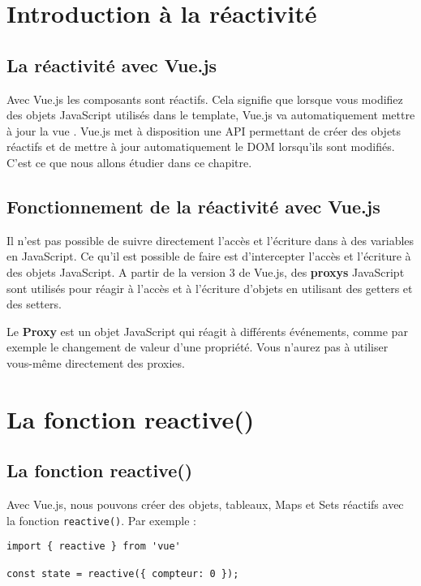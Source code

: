 \section{Introduction à la réactivité}
\subsection{La réactivité avec {\color{monOrange}Vue.js}}
Avec {\color{monOrange}Vue.js} les composants sont réactifs. Cela signifie que lorsque vous modifiez des objets JavaScript utilisés dans le template, {\color{monOrange}Vue.js} va automatiquement mettre à jour la vue . {\color{monOrange}Vue.js} met à disposition une API permettant de créer des objets réactifs et de mettre à jour automatiquement le DOM lorsqu'ils sont modifiés. C'est ce que nous allons étudier dans ce chapitre.

\subsection{Fonctionnement de la réactivité avec {\color{monOrange}Vue.js}}
Il n'est pas possible de suivre directement l'accès et l'écriture dans à des variables en JavaScript. Ce qu'il est possible de faire est d'intercepter l'accès et l'écriture à des objets JavaScript. A partir de la version 3 de {\color{monOrange}Vue.js}, des {\bf proxys} JavaScript sont utilisés pour réagir à l'accès et à l'écriture d'objets en utilisant des getters et des setters.

Le {\bf Proxy} est un objet JavaScript qui réagit à différents événements, comme par exemple le changement de valeur d'une propriété. Vous n'aurez pas à utiliser vous-même directement des proxies.


\section{La fonction reactive()}
\subsection{La fonction {\color{monOrange}reactive()}}
Avec {\color{monOrange}Vue.js}, nous pouvons créer des objets, tableaux, {\color{monOrange}Maps} et {\color{monOrange}Sets} réactifs avec la fonction {\tt reactive()}. Par exemple :
\begin{verbatim}
import { reactive } from 'vue'

const state = reactive({ compteur: 0 });
\end{verbatim}

